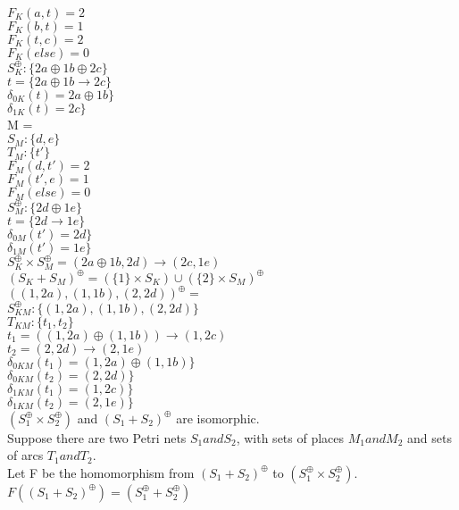 $F_K (a, t) = 2$\\
$F_K (b, t) = 1$\\
$F_K (t, c) = 2$\\
$F_K (else) = 0$\\
%
$S_K^\oplus :\{ 2a \oplus 1b \oplus 2c\}$\\
$t = \{ 2a \oplus 1b \to 2c \}$\\  
$\delta_{0K} (t) = 2a \oplus 1b \}$\\
$\delta_{1K} (t) = 2c \}$\\
\smallskip
M = \\
$S_M :\{d,e\}$\\
$T_M :\{t'\}$\\  
$F_M (d, t') = 2$\\
$F_M (t', e) = 1$\\
$F_M (else) = 0$\\
%
$S_M^\oplus :\{ 2d \oplus 1e\}$\\
$t = \{ 2d \to 1e \}$\\  
$\delta_{0M} (t') = 2d \}$\\
$\delta_{1M} (t') = 1e \}$\\
\smallskip
$S_K^\oplus \times S_M^\oplus = (2a \oplus 1b, 2d) \to (2c, 1e)$\\
\smallskip
$(S_K + S_M)^\oplus = (\{1\} \times S_K) \cup (\{2\} \times S_M)^\oplus$\\
$((1, 2a), (1, 1b), (2, 2d))^\oplus = $\\
$S_{KM}^\oplus: \{(1, 2a), (1, 1b), (2, 2d) \}$\\
$T_{KM}: \{t_1, t_2\}$\\
$t_1 = ((1, 2a) \oplus (1, 1b)) \to (1, 2c)$\\
$t_2 = (2, 2d) \to (2, 1e)$\\
$\delta_{0KM} (t_1) = (1, 2a) \oplus (1, 1b) \}$\\
$\delta_{0KM} (t_2) = (2, 2d) \}$\\
$\delta_{1KM} (t_1) = (1, 2c) \}$\\
$\delta_{1KM} (t_2) = (2, 1e) \}$\\
\smallskip
$(S_1 ^\oplus \times S_2 ^\oplus)$ and $(S_1 + S_2)^\oplus$ are isomorphic. \\
Suppose there are two Petri nets $S_1 and S_2$, with sets of places $M_1 and M_2$ and sets of arcs $T_1 and T_2.$\\
Let F be the homomorphism from $(S_1 + S_2)^\oplus$ to $(S_1 ^\oplus \times S_2 ^\oplus)$. \\
$F((S_1 + S_2)^\oplus) = (S_1 ^\oplus + S_2 ^\oplus)$\\

